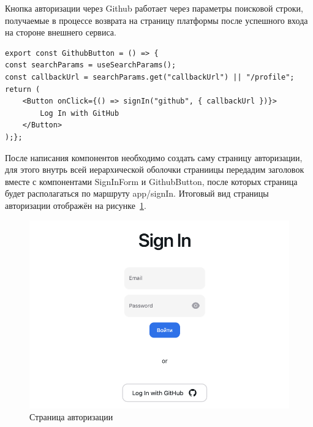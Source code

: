 \documentclass[master, och, pract]{SCWorks}
\begin{document}
Кнопка авторизации через Github работает через параметры поисковой строки, получаемые в процессе возврата на страницу платформы после успешного входа на стороне внешнего сервиса.
\begin{verbatim}
export const GithubButton = () => {
const searchParams = useSearchParams();
const callbackUrl = searchParams.get("callbackUrl") || "/profile";
return (
    <Button onClick={() => signIn("github", { callbackUrl })}>        
        Log In with GitHub
    </Button>
);};
\end{verbatim}

После написания компонентов необходимо создать саму страницу авторизации, для этого внутрь всей иерархической оболочки страниицы передадим заголовок вместе с компонентами SignInForm и GithubButton, после которых страница будет располагаться по маршруту app/signIn. Итоговый вид страницы авторизации отображён на рисунке~\ref{fig:1}. 
\begin{figure}[!ht]
    \centering
    \includegraphics[width=12cm]{images/image-signin.png}
    \caption{\label{fig:1}%
        Страница авторизации}
\end{figure}
\end{document}
